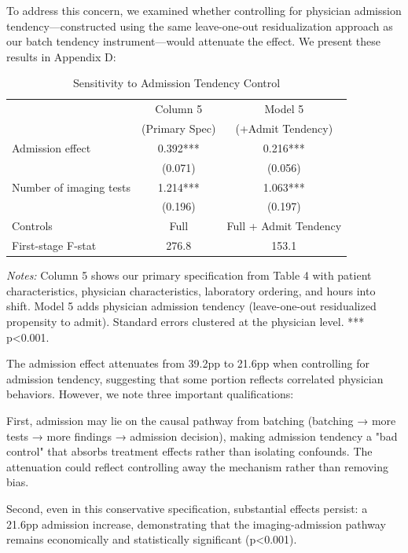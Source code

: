 \documentclass[11pt]{article}
\newcommand{\1}{\hbox{\rm 1\kern-.35em 1}}
\begin{document}
To address this concern, we examined whether controlling for physician admission tendency—constructed using the same leave-one-out residualization approach as our batch tendency instrument—would attenuate the effect. We present these results in Appendix D:

\begin{table}[h]
\centering
\caption*{Sensitivity to Admission Tendency Control}
\begin{threeparttable}
\begin{tabular}{lcc}
\toprule
& Column 5 & Model 5 \\
& (Primary Spec) & (+Admit Tendency) \\
\midrule
Admission effect & 0.392*** & 0.216*** \\
& (0.071) & (0.056) \\
Number of imaging tests & 1.214*** & 1.063*** \\
& (0.196) & (0.197) \\
\midrule
Controls & Full & Full + Admit Tendency \\
First-stage F-stat & 276.8 & 153.1 \\
\bottomrule
\end{tabular}
\begin{tablenotes}
\footnotesize
\item \textit{Notes:} Column 5 shows our primary specification from Table 4 with patient characteristics, physician characteristics, laboratory ordering, and hours into shift. Model 5 adds physician admission tendency (leave-one-out residualized propensity to admit). Standard errors clustered at the physician level. *** p<0.001.
\end{tablenotes}
\end{threeparttable}
\end{table}

The admission effect attenuates from 39.2pp to 21.6pp when controlling for admission tendency, suggesting that some portion reflects correlated physician behaviors. However, we note three important qualifications:

First, admission may lie on the causal pathway from batching (batching → more tests → more findings → admission decision), making admission tendency a "bad control" that absorbs treatment effects rather than isolating confounds. The attenuation could reflect controlling away the mechanism rather than removing bias.

Second, even in this conservative specification, substantial effects persist: a 21.6pp admission increase, demonstrating that the imaging-admission pathway remains economically and statistically significant (p<0.001).
\end{document}
